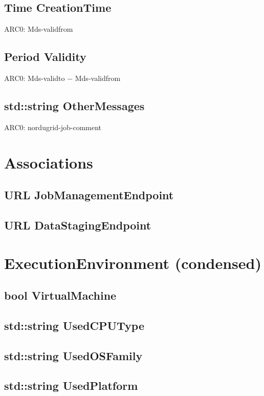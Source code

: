 \documentclass{book}
\begin{document}
\subsection*{Time CreationTime}

ARC0: Mds-validfrom

\subsection*{Period Validity}

ARC0: Mds-validto $-$ Mds-validfrom

\subsection*{std::string OtherMessages}

ARC0: nordugrid-job-comment

\section{Associations}

\subsection*{URL JobManagementEndpoint}

\subsection*{URL DataStagingEndpoint}

\section{ExecutionEnvironment (condensed)}

\subsection*{bool VirtualMachine}

\subsection*{std::string UsedCPUType}

\subsection*{std::string UsedOSFamily}

\subsection*{std::string UsedPlatform}
\end{document}
